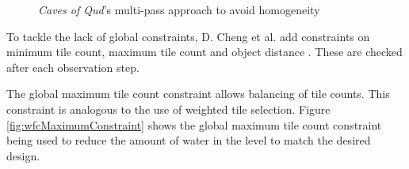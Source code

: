 \begin{figure}[H]
    \centering
    \hfill
    \caption{\textit{Caves of Qud}'s multi-pass approach to avoid homogeneity \cite{GDC_caves_of_qud}}
    \label{fig:cavesOfQudWFCHomogeneity}
\end{figure}

To tackle the lack of global constraints, D. Cheng et al. add constraints on minimum tile count, maximum tile count and object distance \cite{WFC_Automatic_Rules_And_Better_Symmetries}. These are checked after each observation step.

The global maximum tile count constraint allows balancing of tile counts. This constraint is analogous to the use of weighted tile selection. Figure \ref{fig:wfcMaximumConstraint} shows the global maximum tile count constraint being used to reduce the amount of water in the level to match the desired design.

